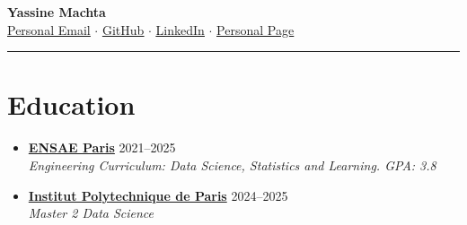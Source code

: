 \documentclass[letterpaper,11pt,twocolumn]{article}
\newcommand{\resumeSubheading}[4]{
	\vspace{-2pt}\item \textbf{#1} \hfill #2 \\
	\textit{\small #3} \hfill \textit{\small #4} 
	\vspace{-7pt}
}
\begin{document}
	
	\begin{center}
		{\LARGE \textbf{Yassine Machta}} \\[5pt]
		\href{mailto:machtayassine@gmail.com}{\underline{Personal Email}} $\cdot$ 
		\href{https://github.com/MachtaYassine}{ \underline{GitHub}} $\cdot$ 
		\href{https://www.linkedin.com/in/yassine-machta-a00307206/}{ \underline{LinkedIn}} $\cdot$ 
		\href{https://machtayassine.github.io}{ \underline{Personal Page}}
	\end{center}
	
	\vspace{-10pt}
	\hrule
	\vspace{-19pt}
	
	\section{Education}
	\begin{itemize}[leftmargin=*]
		\resumeSubheading
		{\href{https://www.ensae.fr/en}{ENSAE Paris}}{2021--2025}
		{Engineering Curriculum: Data Science, Statistics and Learning. GPA: 3.8}{}
		\resumeSubheading
		{\href{https://www.ip-paris.fr/}{Institut Polytechnique de Paris}}{2024--2025}
		{Master 2 Data Science}{}
	\end{itemize}
	
\end{document}
